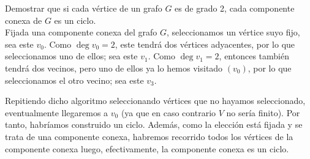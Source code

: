 \begin{ejercicio}\label{ej:1.7}
    Demostrar que si cada vértice de un grafo $G$ es de grado 2, cada componente conexa de $G$ es un ciclo.\\

    Fijada una componente conexa del grafo $G$, seleccionamos un vértice suyo fijo, sea este $v_0$. Como $\deg v_0=2$, este tendrá dos vértices adyacentes, por lo que seleccionamos uno de ellos; sea este $v_1$. Como $\deg v_1=2$, entonces también tendrá dos vecinos, pero uno de ellos ya lo hemos visitado $(v_0)$, por lo que seleccionamos el otro vecino; sea este $v_3$.
    
    Repitiendo dicho algoritmo seleccionando vértices que no hayamos seleccionado, eventualmente llegaremos a $v_0$ (ya que en caso contrario $V$ no sería finito). Por tanto, habríamos construido un ciclo. Además, como la elección está fijada y se trata de una componente conexa, habremos recorrido todos los vértices de la componente conexa luego, efectivamente, la componente conexa es un ciclo.
\end{ejercicio}

